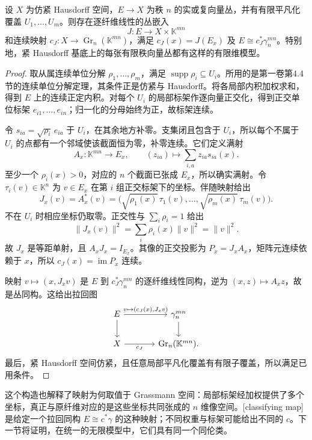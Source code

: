 \begin{proposition}\label{g2:prop:bundle-embedding-classifier}
	设 \(X\) 为仿紧 Hausdorff 空间，\(E\to X\) 为秩 \(n\) 的实或复向量丛，并有有限平凡化覆盖 \(U_1,\ldots,U_m\)。则存在逐纤维线性的丛嵌入
	\[
		J:E\longrightarrow X\times\mathbb K^{mn}
	\]
	和连续映射 \(c_J:X\to\operatorname{Gr}_n(\mathbb K^{mn})\)，满足 \(c_J(x)=J(E_x)\) 及 \(E\cong c_J^*\gamma_n^{mn}\)。特别地，紧 Hausdorff 基底上的每张有限秩向量丛都有这样的有限维模型。
\end{proposition}
\begin{proof}
	取从属连续单位分解 \(\rho_1,\ldots,\rho_m\)，满足 \(\operatorname{supp}\rho_i\subseteq U_i\)。所用的是第一卷第4.4节的连续单位分解定理，其条件正是仿紧与 Hausdorff。将各局部内积加权求和，得到 \(E\) 上的连续正定内积。对每个 \(U_i\) 的局部标架作逐向量正交化，得到正交单位标架 \(e_{i1},\ldots,e_{in}\)；归一化的分母始终为正，故标架连续。

	令 \(s_{ia}=\sqrt{\rho_i}\,e_{ia}\) 于 \(U_i\)，在其余地方补零。支集闭且包含于 \(U_i\)，所以每个不属于 \(U_i\) 的点都有一个邻域使该截面恒为零，补零连续。它们定义满射
	\[
		A_x:\mathbb K^{mn}\longrightarrow E_x,\qquad
		(z_{ia})\longmapsto\sum_{i,a}z_{ia}s_{ia}(x).
	\]
	至少一个 \(\rho_i(x)>0\)，对应的 \(n\) 个截面已张成 \(E_x\)，所以确实满射。令 \(\tau_i(v)\in\mathbb K^n\) 为 \(v\in E_x\) 在第 \(i\) 组正交标架下的坐标。伴随映射给出
	\begin{equation}\label{g2:eq:weighted-bundle-embedding}
		J_x(v)=A_x^*(v)
		=\bigl(\sqrt{\rho_1(x)}\,\tau_1(v),\ldots,
		\sqrt{\rho_m(x)}\,\tau_m(v)\bigr).
	\end{equation}
	不在 \(U_i\) 时相应坐标仍取零。正交性与 \(\sum_i\rho_i=1\) 给出
	\[
		\|J_x(v)\|^2=\sum_i\rho_i(x)\|v\|^2=\|v\|^2.
	\]
	故 \(J_x\) 是等距单射，且 \(A_xJ_x=I_{E_x}\)。其像的正交投影为 \(P_x=J_xA_x\)，矩阵元连续依赖于 \(x\)，所以 \(c_J(x)=\operatorname{im}P_x\) 连续。

	映射 \(v\mapsto(x,J_xv)\) 是 \(E\) 到 \(c_J^*\gamma_n^{mn}\) 的逐纤维线性同构，逆为 \((x,z)\mapsto A_xz\)，故是丛同构。这给出拉回图
	\[
		\begin{tikzcd}[column sep=large]
			E\arrow[r,"{v\mapsto(c_J(x),J_xv)}"]\arrow[d]&\gamma_n^{mn}\arrow[d]\\
			X\arrow[r,"c_J"']&\operatorname{Gr}_n(\mathbb K^{mn}).
		\end{tikzcd}
	\]
	最后，紧 Hausdorff 空间仿紧，且任意局部平凡化覆盖有有限子覆盖，所以满足已用条件。
\end{proof}

这个构造也解释了映射为何取值于 Grassmann 空间：局部标架经加权提供了多个坐标，真正与原纤维对应的是这些坐标共同张成的 \(n\) 维像空间。[classifying map]是给定一个拉回同构 \(E\cong c^*\gamma\) 的这种映射；不同权重与标架可能给出不同的 \(c\)。下一节将证明，在统一的无限模型中，它们具有同一个同伦类。

